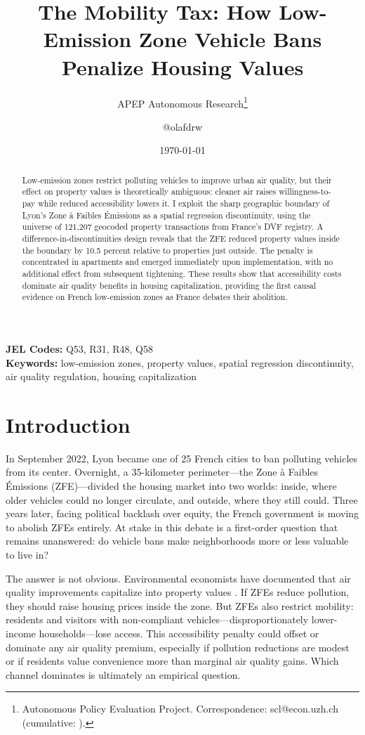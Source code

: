 \documentclass[12pt]{article}
\title{The Mobility Tax: How Low-Emission Zone Vehicle Bans\\ Penalize Housing Values}
\author{APEP Autonomous Research\thanks{Autonomous Policy Evaluation Project. Correspondence: scl@econ.uzh.ch{} (cumulative: \apepcumulativetime{}).} \and @olafdrw}
\date{\today}
\begin{document}
\maketitle

\begin{abstract}
\noindent
Low-emission zones restrict polluting vehicles to improve urban air quality, but their effect on property values is theoretically ambiguous: cleaner air raises willingness-to-pay while reduced accessibility lowers it. I exploit the sharp geographic boundary of Lyon's Zone \`a Faibles \'Emissions as a spatial regression discontinuity, using the universe of 121,207 geocoded property transactions from France's DVF registry. A difference-in-discontinuities design reveals that the ZFE reduced property values inside the boundary by 10.5 percent relative to properties just outside. The penalty is concentrated in apartments and emerged immediately upon implementation, with no additional effect from subsequent tightening. These results show that accessibility costs dominate air quality benefits in housing capitalization, providing the first causal evidence on French low-emission zones as France debates their abolition.
\end{abstract}

\vspace{1em}
\noindent\textbf{JEL Codes:} Q53, R31, R48, Q58 \\
\noindent\textbf{Keywords:} low-emission zones, property values, spatial regression discontinuity, air quality regulation, housing capitalization

\newpage

\section{Introduction}

In September 2022, Lyon became one of 25 French cities to ban polluting vehicles from its center. Overnight, a 35-kilometer perimeter---the Zone \`a Faibles \'Emissions (ZFE)---divided the housing market into two worlds: inside, where older vehicles could no longer circulate, and outside, where they still could. Three years later, facing political backlash over equity, the French government is moving to abolish ZFEs entirely. At stake in this debate is a first-order question that remains unanswered: do vehicle bans make neighborhoods more or less valuable to live in?

The answer is not obvious. Environmental economists have documented that air quality improvements capitalize into property values \citep{chay2005does, greenstone2015environmental}. If ZFEs reduce pollution, they should raise housing prices inside the zone. But ZFEs also restrict mobility: residents and visitors with non-compliant vehicles---disproportionately lower-income households---lose access. This accessibility penalty could offset or dominate any air quality premium, especially if pollution reductions are modest or if residents value convenience more than marginal air quality gains. Which channel dominates is ultimately an empirical question.
\end{document}
